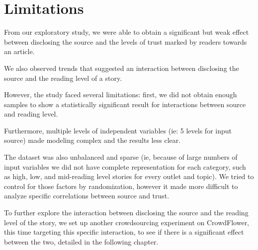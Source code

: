 



 






\section{Limitations}

From our exploratory study, we were able to obtain a significant but weak effect between disclosing the source and the levels of trust marked by readers towards an article.

We also observed trends that suggested an interaction between disclosing the source and the reading level of a story.

However, the study faced several limitations: first, we did not obtain enough samples to show a statistically significant result for interactions between source and reading level.

Furthermore, multiple levels of independent variables (ie: 5 levels for input source) made modeling complex and the results less clear.

The dataset was also unbalanced and sparse (ie, because of large numbers of input variables we did not have complete representation for each category, such as high, low, and mid-reading level stories for every outlet and topic). We tried to control for those factors by randomization, however it made more difficult to analyze specific correlations between source and trust.

To further explore the interaction between disclosing the source and the reading level of the story, we set up another crowdsourcing experiment on CrowdFlower, this time targeting this specific interaction, to see if there is a significant effect between the two, detailed in the following chapter.
 
